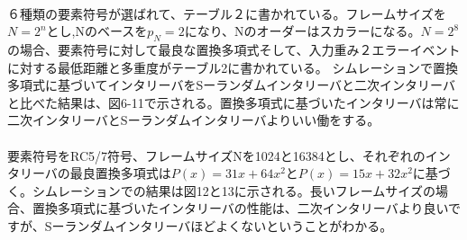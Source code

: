 \documentclass[20 pts]{article}
\begin{document}
\paragraph{}
６種類の要素符号が選ばれて、テーブル２に書かれている。フレームサイズを$N=2^n$とし,Nのベースを$p_N=2$になり、Nのオーダーはスカラーになる。$N=2^8$の場合、要素符号に対して最良な置換多項式そして、入力重み２エラーイベントに対する最低距離と多重度がテーブル2に書かれている。
シムレーションで置換多項式に基づいてインタリーバをSーランダムインタリーバと二次インタリーバと比べた結果は、図6-11で示される。置換多項式に基づいたインタリーバは常に二次インタリーバとSーランダムインタリーバよりいい働をする。
\paragraph{}
要素符号をRC5/7符号、フレームサイズNを1024と16384とし、それぞれのインタリーバの最良置換多項式は$P(x)=31x+64x^2$と$P(x)=15x+32x^2$に基づく。シムレーションでの結果は図12と13に示される。長いフレームサイズの場合、置換多項式に基づいたインタリーバの性能は、二次インタリーバより良いですが、Sーランダムインタリーバほどよくないということがわかる。
\end{document}
